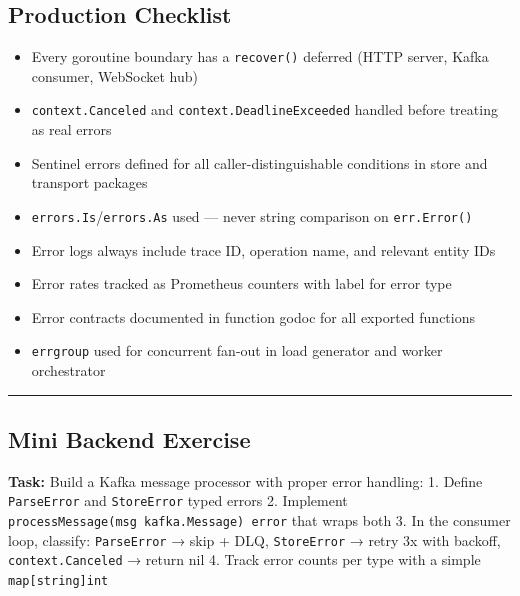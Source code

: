 \documentclass[
]{article}
\providecommand{\tightlist}{%
  \setlength{\itemsep}{0pt}\setlength{\parskip}{0pt}}
\begin{document}
\hypertarget{production-checklist-3}{%
\subsection{Production Checklist}\label{production-checklist-3}}

\begin{itemize}
\tightlist
\item[$\square$]
  Every goroutine boundary has a \texttt{recover()} deferred (HTTP
  server, Kafka consumer, WebSocket hub)
\item[$\square$]
  \texttt{context.Canceled} and \texttt{context.DeadlineExceeded}
  handled before treating as real errors
\item[$\square$]
  Sentinel errors defined for all caller-distinguishable conditions in
  store and transport packages
\item[$\square$]
  \texttt{errors.Is}/\texttt{errors.As} used --- never string comparison
  on \texttt{err.Error()}
\item[$\square$]
  Error logs always include trace ID, operation name, and relevant
  entity IDs
\item[$\square$]
  Error rates tracked as Prometheus counters with label for error type
\item[$\square$]
  Error contracts documented in function godoc for all exported
  functions
\item[$\square$]
  \texttt{errgroup} used for concurrent fan-out in load generator and
  worker orchestrator
\end{itemize}

\begin{center}\rule{0.5\linewidth}{0.5pt}\end{center}

\hypertarget{mini-backend-exercise-3}{%
\subsection{Mini Backend Exercise}\label{mini-backend-exercise-3}}

\textbf{Task:} Build a Kafka message processor with proper error
handling: 1. Define \texttt{ParseError} and \texttt{StoreError} typed
errors 2. Implement \texttt{processMessage(msg\ kafka.Message)\ error}
that wraps both 3. In the consumer loop, classify: \texttt{ParseError} →
skip + DLQ, \texttt{StoreError} → retry 3x with backoff,
\texttt{context.Canceled} → return nil 4. Track error counts per type
with a simple \texttt{map{[}string{]}int}
\end{document}

